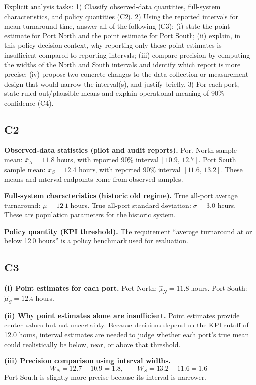 \begin{ExamProblems}
		Explicit analysis tasks:
		1) Classify observed-data quantities, full-system characteristics, and policy quantities (C2).
		2) Using the reported intervals for mean turnaround time, answer all of the following (C3): (i) state the point estimate for Port North and the point estimate for Port South; (ii) explain, in this policy-decision context, why reporting only those point estimates is insufficient compared to reporting intervals; (iii) compare precision by computing the widths of the North and South intervals and identify which report is more precise; (iv) propose two concrete changes to the data-collection or measurement design that would narrow the interval(s), and justify briefly.
		3) For each port, state ruled-out/plausible means and explain operational meaning of 90\% confidence (C4).
		
		\subsection*{C2}
		\textbf{Observed-data statistics (pilot and audit reports).}
		Port North sample mean: $\bar{x}_N=11.8$ hours, with reported 90\% interval $[10.9,\,12.7]$.
		Port South sample mean: $\bar{x}_S=12.4$ hours, with reported 90\% interval $[11.6,\,13.2]$.
		These means and interval endpoints come from observed samples.
		
		\textbf{Full-system characteristics (historic old regime).}
		True all-port average turnaround: $\mu=12.1$ hours.
		True all-port standard deviation: $\sigma=3.0$ hours.
		These are population parameters for the historic system.
		
		\textbf{Policy quantity (KPI threshold).}
		The requirement ``average turnaround at or below 12.0 hours'' is a policy benchmark used for evaluation.
		
		\subsection*{C3}
		\textbf{(i) Point estimates for each port.}
		Port North: $\hat{\mu}_N=11.8$ hours.
		Port South: $\hat{\mu}_S=12.4$ hours.
		
		\textbf{(ii) Why point estimates alone are insufficient.}
		Point estimates provide center values but not uncertainty.
		Because decisions depend on the KPI cutoff of 12.0 hours, interval estimates are needed to judge whether each port's true mean could realistically be below, near, or above that threshold.
		
		\textbf{(iii) Precision comparison using interval widths.}
		\[
		W_N=12.7-10.9=1.8,\qquad W_S=13.2-11.6=1.6
		\]
		Port South is slightly more precise because its interval is narrower.
		

\end{ExamProblems}
